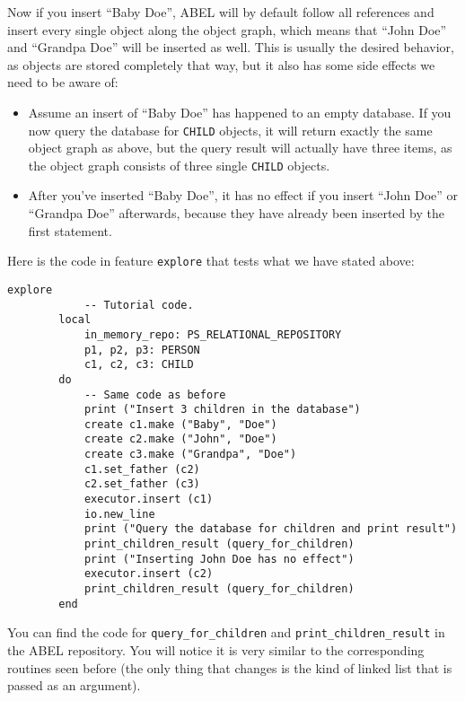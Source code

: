 \documentclass[a4paper,12pt]{report}
\begin{document}
	\begin{center}
	\end{center}

Now if you insert ``Baby Doe'', ABEL will by default follow all references and insert every single object along the object graph, which means that ``John Doe'' and ``Grandpa Doe'' will be inserted as well.
This is usually the desired behavior, as objects are stored completely that way, but it also has some side effects we need to be aware of:

\begin{itemize}
\item Assume an insert of ``Baby Doe'' has happened to an empty database. 
If you now query the database for \lstinline!CHILD! objects, it will return exactly the same object graph as above, but the query result will actually have three items, as the object graph consists of three single \lstinline!CHILD! objects.
	
\item After you've inserted ``Baby Doe'', it has no effect if you insert ``John Doe'' or ``Grandpa Doe'' afterwards, because they have already been inserted by the first statement.
\end{itemize}

Here is the code in feature \lstinline{explore} that tests what we have stated above:
\begin{lstlisting}[language=OOSC2Eiffel, captionpos=b, caption={Inserting objects having references to other objects.}, label={lst:references_handling}]
	explore
			-- Tutorial code.
		local
			in_memory_repo: PS_RELATIONAL_REPOSITORY
			p1, p2, p3: PERSON
			c1, c2, c3: CHILD
		do
			-- Same code as before
			print ("Insert 3 children in the database")
			create c1.make ("Baby", "Doe")
			create c2.make ("John", "Doe")
			create c3.make ("Grandpa", "Doe")
			c1.set_father (c2)
			c2.set_father (c3)
			executor.insert (c1)
			io.new_line
			print ("Query the database for children and print result")
			print_children_result (query_for_children)
			print ("Inserting John Doe has no effect")
			executor.insert (c2)
			print_children_result (query_for_children)
		end
\end{lstlisting}
You can find the code for \lstinline{query_for_children} and \lstinline{print_children_result} in the ABEL repository. You will notice it is very similar to the corresponding routines seen before (the only thing that changes is the kind of linked list that is passed as an argument).
\end{document}

